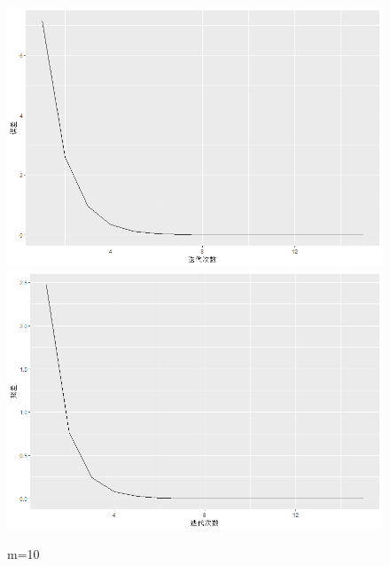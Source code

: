 \documentclass[10pt]{article}
\begin{document}
\begin{enumerate}
\begin{figure}[H]
  \centering
  \includegraphics[width=.8\textwidth]{5-m=101.png}
  \includegraphics[width=.8\textwidth]{5-m=102.png}
  \caption{m=10}
  \end{figure}
  

\end{enumerate}
\end{document}
